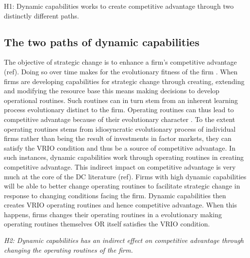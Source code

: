 \documentclass[review,fleqn]{elsarticle}\usepackage[]{graphicx}\usepackage[]{color}
\begin{document}
H1: Dynamic capabilities works to create competitive advantage through two distinctly
different paths.

\subsection{The two paths of dynamic capabilities}
The objective of strategic change is to enhance a firm’s competitive advantage
(ref). Doing so over time makes for the evolutionary fitness of the firm
\citep{Helfat2007}. When firms are developing capabilities for strategic change through
creating, extending and modifying the resource base this means making decisions to develop
operational routines. Such routines can in turn stem from an inherent learning process
evolutionary distinct to the firm. Operating routines can thus lead to competitive
advantage because of their evolutionary character \citep{Nelson1982,Winter2003}. To the
extent operating routines stems from idiosyncratic evolutionary process of individual
firms rather than being the result of investments in factor markets, they can satisfy the
VRIO condition and thus be a source of competitive advantage. In such instances, dynamic
capabilities work through operating routines in creating competitive advantage. This
indirect impact on competitive advantage is very much at the core of the DC literature
(ref). Firms with high dynamic capabilities will be able to better change operating
routines to facilitate strategic change in response to changing conditions facing the
firm. Dynamic capabilities then creates VRIO operating routines and hence competitive
advantage. When this happens, firms changes their operating routines in a evolutionary
making operating routines themselves OR itself satisfies the VRIO condition.

\emph{H2: Dynamic capabilities has an indirect effect on competitive advantage through
  changing the operating routines of the firm.}
\end{document}
